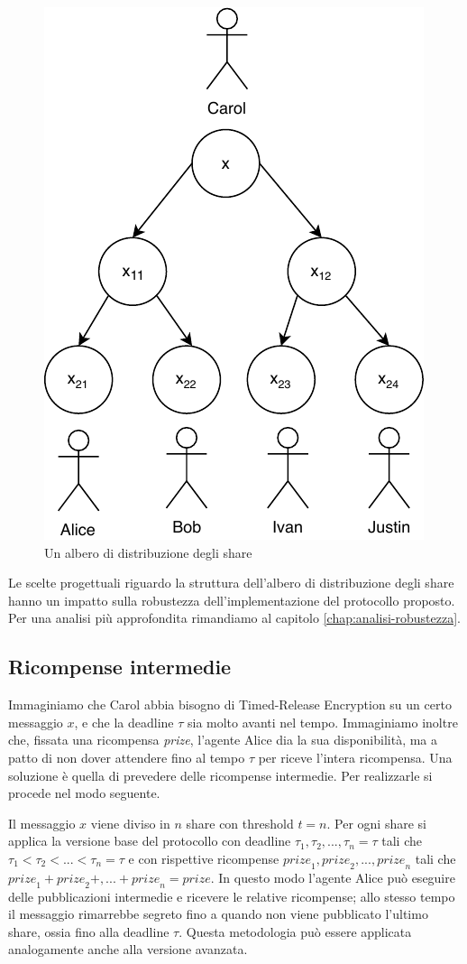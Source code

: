\begin{figure}[H]
	\centering
	\includegraphics[width=0.45\linewidth]{images/chap_protocollo/protocollo-gerarchia.pdf}
	\caption{Un albero di distribuzione degli share}
\end{figure}

Le scelte progettuali riguardo la struttura dell'albero di distribuzione degli share hanno un
impatto sulla robustezza dell'implementazione del protocollo proposto. Per una analisi più
approfondita rimandiamo al capitolo \ref{chap:analisi-robustezza}.

\subsection{Ricompense intermedie}
Immaginiamo che Carol abbia bisogno di Timed-Release Encryption su un certo messaggio $ x $, e
che la deadline $ \tau $ sia molto avanti nel tempo.
Immaginiamo inoltre che, fissata una ricompensa \textit{prize},
l'agente Alice dia la sua disponibilità, ma a patto di non dover attendere fino al tempo $ \tau $
per riceve l'intera
ricompensa. Una soluzione è quella di prevedere delle ricompense intermedie.
Per realizzarle si procede nel modo seguente.

Il messaggio $ x $ viene diviso in $ n $ share con threshold $ t = n $.
Per ogni share si applica la versione base del protocollo
con deadline $ \tau_1, \tau_2, ... , \tau_n = \tau $
tali che $ \tau_1 < \tau_2 < ... < \tau_n = \tau $ e con rispettive ricompense
$ \textit{prize}_1, \textit{prize}_2, ..., \textit{prize}_n $ tali che
$ \textit{prize}_1 + \textit{prize}_2 +, ... + \textit{prize}_n = \textit{prize} $.
In questo modo l'agente Alice può eseguire delle pubblicazioni intermedie e ricevere le relative
ricompense; allo stesso tempo il messaggio rimarrebbe segreto fino a quando non viene pubblicato
l'ultimo share, ossia fino alla deadline $ \tau $.
Questa metodologia può essere applicata analogamente anche alla versione avanzata.